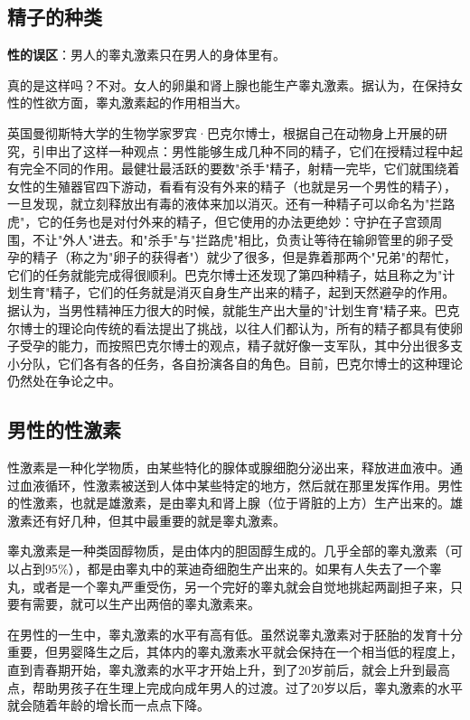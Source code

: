 \documentclass[12pt,a4paper,twoside]{ctexbook}
\begin{document}
\subsection{精子的种类}

\textbf{性的误区}：男人的睾丸激素只在男人的身体里有。

真的是这样吗？不对。女人的卵巢和肾上腺也能生产睾丸激素。据认为，在保持女性的性欲方面，睾丸激素起的作用相当大。

英国曼彻斯特大学的生物学家罗宾·巴克尔博士，根据自己在动物身上开展的研究，引申出了这样一种观点：男性能够生成几种不同的精子，它们在授精过程中起有完全不同的作用。最健壮最活跃的要数"杀手"精子，射精一完毕，它们就围绕着女性的生殖器官四下游动，看看有没有外来的精子（也就是另一个男性的精子），一旦发现，就立刻释放出有毒的液体来加以消灭。还有一种精子可以命名为"拦路虎"，它的任务也是对付外来的精子，但它使用的办法更绝妙：守护在子宫颈周围，不让"外人"进去。和"杀手"与"拦路虎"相比，负责让等待在输卵管里的卵子受孕的精子（称之为"卵子的获得者"）就少了很多，但是靠着那两个"兄弟"的帮忙，它们的任务就能完成得很顺利。巴克尔博士还发现了第四种精子，姑且称之为"计划生育"精子，它们的任务就是消灭自身生产出来的精子，起到天然避孕的作用。据认为，当男性精神压力很大的时候，就能生产出大量的"计划生育"精子来。巴克尔博士的理论向传统的看法提出了挑战，以往人们都认为，所有的精子都具有使卵子受孕的能力，而按照巴克尔博士的观点，精子就好像一支军队，其中分出很多支小分队，它们各有各的任务，各自扮演各自的角色。目前，巴克尔博士的这种理论仍然处在争论之中。

\subsection{男性的性激素}

性激素是一种化学物质，由某些特化的腺体或腺细胞分泌出来，释放进血液中。通过血液循环，性激素被送到人体中某些特定的地方，然后就在那里发挥作用。男性的性激素，也就是雄激素，是由睾丸和肾上腺（位于肾脏的上方）生产出来的。雄激素还有好几种，但其中最重要的就是睾丸激素。

睾丸激素是一种类固醇物质，是由体内的胆固醇生成的。几乎全部的睾丸激素（可以占到95\%），都是由睾丸中的莱迪奇细胞生产出来的。如果有人失去了一个睾丸，或者是一个睾丸严重受伤，另一个完好的睾丸就会自觉地挑起两副担子来，只要有需要，就可以生产出两倍的睾丸激素来。

在男性的一生中，睾丸激素的水平有高有低。虽然说睾丸激素对于胚胎的发育十分重要，但男婴降生之后，其体内的睾丸激素水平就会保持在一个相当低的程度上，直到青春期开始，睾丸激素的水平才开始上升，到了20岁前后，就会上升到最高点，帮助男孩子在生理上完成向成年男人的过渡。过了20岁以后，睾丸激素的水平就会随着年龄的增长而一点点下降。
\end{document}
